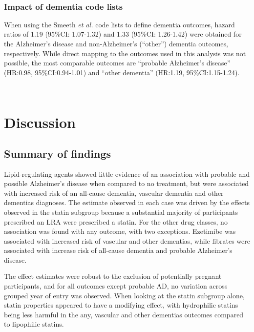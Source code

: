 \documentclass[a4paper, twoside]{templates/ociamthesis}
\begin{document}
~

\hypertarget{comparing-codelists}{%
\subsubsection{Impact of dementia code lists}\label{comparing-codelists}}

When using the Smeeth \emph{et al.} code lists to define dementia outcomes, hazard ratios of 1.19 (95\%CI: 1.07-1.32) and 1.33 (95\%CI: 1.26-1.42) were obtained for the Alzheimer's disease and non-Alzheimer's (``other'') dementia outcomes, respectively. While direct mapping to the outcomes used in this analysis was not possible, the most comparable outcomes are ``probable Alzheimer's disease'' (HR:0.98, 95\%CI:0.94-1.01) and ``other dementia'' (HR:1.19, 95\%CI:1.15-1.24).

~

\hypertarget{discussion-2}{%
\section{Discussion}\label{discussion-2}}

\hypertarget{summary-of-findings-1}{%
\subsection{Summary of findings}\label{summary-of-findings-1}}

Lipid-regulating agents showed little evidence of an association with probable and possible Alzheimer's disease when compared to no treatment, but were associated with increased risk of an all-cause dementia, vascular dementia and other dementias diagnoses. The estimate observed in each case was driven by the effects observed in the statin subgroup because a substantial majority of participants prescribed an LRA were prescribed a statin. For the other drug classes, no association was found with any outcome, with two exceptions. Ezetimibe was associated with increased risk of vascular and other dementias, while fibrates were associated with increase risk of all-cause dementia and probable Alzheimer's disease.

The effect estimates were robust to the exclusion of potentially pregnant participants, and for all outcomes except probable AD, no variation across grouped year of entry was observed. When looking at the statin subgroup alone, statin properties appeared to have a modifying effect, with hydrophilic statins being less harmful in the any, vascular and other dementias outcomes compared to lipophilic statins.
\end{document}
